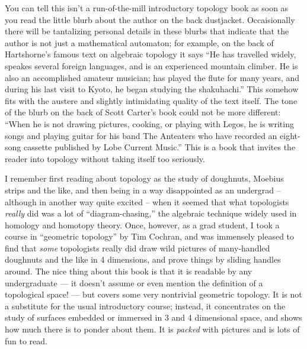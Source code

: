 \documentclass{article}
\begin{document}
You can tell this isn't a run-of-the-mill introductory topology book as
soon as you read the little blurb about the author on the back
dustjacket. Occaisionally there will be tantalizing personal details in
these blurbs that indicate that the author is not just a mathematical
automaton; for example, on the back of Hartshorne's famous text on
algebraic topology it says ``He has travelled widely, speakes several
foreign languages, and is an experienced mountain climber. He is also an
accomplished amateur musician; has played the flute for many years, and
during his last visit to Kyoto, he began studying the shakuhachi.'' This
somehow fits with the austere and slightly intimidating quality of the
text itself. The tone of the blurb on the back of Scott Carter's book
could not be more different: ``When he is not drawing pictures, cooking,
or playing with Legos, he is writing songs and playing guitar for his
band The Anteaters who have recorded an eight-song cassette published by
Lobe Current Music.'' This is a book that invites the reader into
topology without taking itself too seriously.

I remember first reading about topology as the study of doughnuts,
Moebius strips and the like, and then being in a way disappointed as an
undergrad -- although in another way quite excited -- when it seemed
that what topologists \emph{really} did was a lot of
``diagram-chasing,'' the algebraic technique widely used in homology and
homotopy theory. Once, however, as a grad student, I took a course in
``geometric topology'' by Tim Cochran, and was immensely pleased to find
that \emph{some} topologists really did draw wild pictures of
many-handled doughnuts and the like in 4 dimensions, and prove things by
sliding handles around. The nice thing about this book is that it is
readable by any undergraduate --- it doesn't assume or even mention the
definition of a topological space! --- but covers some very nontrivial
geometric topology. It is not a substitute for the usual introductory
course; instead, it concentrates on the study of surfaces embedded or
immersed in 3 and 4 dimensional space, and shows how much there is to
ponder about them. It is \emph{packed} with pictures and is lots of fun
to read.
\end{document}

